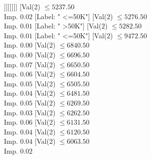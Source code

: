 \documentclass[margin=10pt]{standalone}
\begin{document}
\begin{forest}
																																									[Label: " <=50K"]
																																									[Val($2$) $ \leq 5078.50$ \\ Imp. $0.06$
																																										[Label: " >50K"]
																																										[Val($2$) $ \leq 5081.50$ \\ Imp. $0.14$
																																											[Label: " <=50K"]
																																											[Val($2$) $ \leq 5188.50$ \\ Imp. $0.02$
																																												[Label: " >50K"]
																																												[Label: " <=50K"]]]]]]]]
																																					[Val($2$) $ \leq 5237.50$ \\ Imp. $0.02$
																																						[Label: " <=50K"]
																																						[Val($2$) $ \leq 5276.50$ \\ Imp. $0.01$
																																							[Label: " >50K"]
																																							[Val($2$) $ \leq 5282.50$ \\ Imp. $0.01$
																																								[Label: " <=50K"]
																																								[Val($2$) $ \leq 9472.50$ \\ Imp. $0.00$
																																									[Val($2$) $ \leq 6840.50$ \\ Imp. $0.00$
																																										[Val($2$) $ \leq 6696.50$ \\ Imp. $0.07$
																																											[Val($2$) $ \leq 6650.50$ \\ Imp. $0.06$
																																												[Val($2$) $ \leq 6604.50$ \\ Imp. $0.05$
																																													[Val($2$) $ \leq 6505.50$ \\ Imp. $0.04$
																																														[Val($2$) $ \leq 6481.50$ \\ Imp. $0.05$
																																															[Val($2$) $ \leq 6269.50$ \\ Imp. $0.03$
																																																[Val($2$) $ \leq 6262.50$ \\ Imp. $0.06$
																																																	[Val($2$) $ \leq 6131.50$ \\ Imp. $0.04$
																																																		[Val($2$) $ \leq 6120.50$ \\ Imp. $0.04$
																																																			[Val($2$) $ \leq 6063.50$ \\ Imp. $0.02$

\end{forest}
\end{document}
